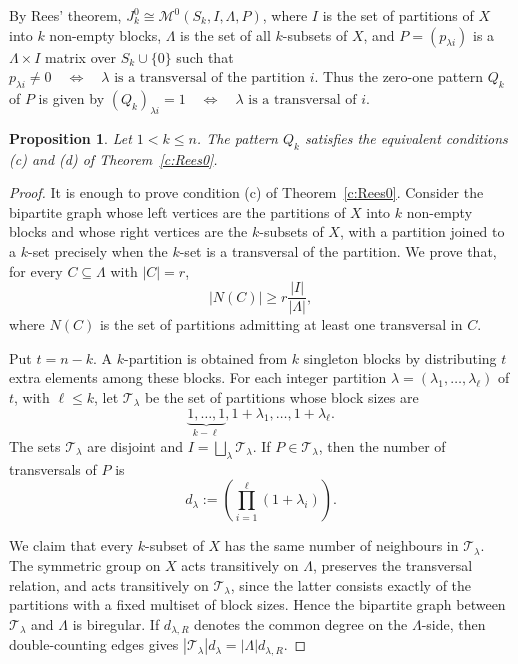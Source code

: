 \documentclass[11pt]{article}
\theoremstyle{plain}
\newtheorem{prop}[theorem]{Proposition}
\theoremstyle{remark}
\theoremstyle{definition}
\theoremstyle{plain}
\begin{document}
By Rees' theorem,
 ${J_k^0}\cong \mathcal M^0(S_k,I,\Lambda,P)$,
where $I$ is the set of partitions of $X$ into $k$ non-empty blocks, $\Lambda$
is the set of all $k$-subsets of $X$, and $P=(p_{\lambda i})$ is a
$\Lambda\times I$ matrix over $S_k\cup\{0\}$ such that
\(p_{\lambda i}\ne0\quad\Longleftrightarrow\quad\lambda\text{ is a transversal of the partition }i.\)
Thus the zero-one pattern $Q_k$ of $P$ is given by
\((Q_k)_{\lambda i}=1 \quad\Longleftrightarrow\quad \lambda\text{ is a transversal of }i.\)

\begin{prop}\label{p:Tn-pattern-Hall}
Let $1<k\le n$. The pattern $Q_k$ satisfies the equivalent conditions (c) and
(d) of Theorem~\ref{c:Rees0}.
\end{prop}

\begin{proof}
It is enough to prove condition (c) of Theorem~\ref{c:Rees0}. Consider the
bipartite graph whose left vertices are the partitions of $X$ into $k$ non-empty
blocks and whose right vertices are the $k$-subsets of $X$, with a partition
joined to a $k$-set precisely when the $k$-set is a transversal of the partition.
We prove that, for every $C\subseteq\Lambda$ with $|C|=r$,
\[
        |N(C)|\ge r\frac{|I|}{|\Lambda|},
\]
where $N(C)$ is the set of partitions admitting at least one transversal in $C$.

Put $t=n-k$. A $k$-partition is obtained from $k$ singleton blocks by
distributing $t$ extra elements among these blocks. For each integer partition
$\lambda=(\lambda_1,\ldots,\lambda_\ell)$ of $t$, with $\ell\le k$, let
$\mathcal T_\lambda$ be the set of partitions whose block sizes are
\[
        \underbrace{1,\ldots,1}_{k-\ell},
        1+\lambda_1,\ldots,1+\lambda_\ell.
\]
The sets $\mathcal T_\lambda$ are disjoint and
\(I=\bigsqcup_\lambda \mathcal T_\lambda.\)
If $P\in\mathcal T_\lambda$, then the number of transversals of $P$ is
\[
        d_\lambda:=\left(\prod_{i=1}^\ell(1+\lambda_i)\right).
\]

We claim that every $k$-subset of $X$ has the same number of neighbours in
$\mathcal T_\lambda$. The symmetric group on $X$ acts transitively on
$\Lambda$, preserves the transversal relation, and acts transitively on
$\mathcal T_\lambda$, since the latter consists exactly of the partitions with a
fixed multiset of block sizes. Hence the bipartite graph between
$\mathcal T_\lambda$ and $\Lambda$ is biregular. If $d_{\lambda,R}$ denotes the
common degree on the $\Lambda$-side, then double-counting edges gives $|\mathcal T_\lambda|d_\lambda=|\Lambda|d_{\lambda,R}$.


\end{proof}
\end{document}
